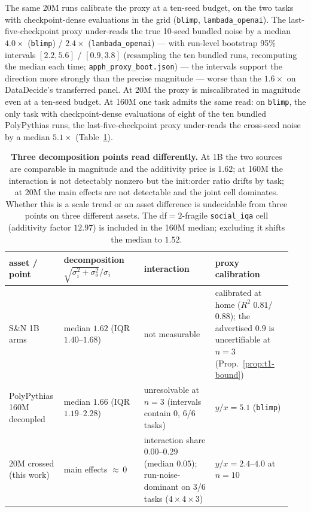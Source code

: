 The same 20M runs calibrate the proxy at a ten-seed budget, on the two tasks with
checkpoint-dense evaluations in the grid (\texttt{blimp}, \texttt{lambada\_openai}). The last-five-checkpoint proxy
under-reads the true 10-seed bundled noise by a median $4.0\times$ (\texttt{blimp}) /
$2.4\times$ (\texttt{lambada\_openai}) --- with run-level bootstrap 95\% intervals
$[2.2, 5.6]$ / $[0.9, 3.8]$ (resampling the ten bundled runs, recomputing the median each
time; \texttt{apph\_proxy\_boot.json}) --- the intervals support the direction more strongly than the precise magnitude ---
worse than the $1.6\times$ on DataDecide's
transferred panel. At 20M the proxy is miscalibrated in magnitude even at a ten-seed budget. At 160M one task admits the same read: on \texttt{blimp}, the only task with checkpoint-dense evaluations of eight of the ten bundled PolyPythias runs, the last-five-checkpoint proxy under-reads the cross-seed noise by a median $5.1\times$ (Table~\ref{tab:crossed}).

\begin{table}[!htbp]
\centering
\caption{\textbf{Three decomposition points read differently.} At 1B the two sources are
comparable in magnitude and the additivity price is $1.62$; at 160M the interaction is not
detectably nonzero but the init:order ratio drifts by task; at 20M the main effects are not
detectable and the joint cell dominates. Whether this is a scale trend or an asset difference
is undecidable from three points on three different assets. The df$=2$-fragile
\texttt{social\_iqa} cell (additivity factor $12.97$) is included in the 160M median;
excluding it shifts the median to $1.52$.}
\label{tab:crossed}
\footnotesize
\setlength{\tabcolsep}{3pt}
\begin{tabular}{@{}p{0.17\linewidth}p{0.27\linewidth}p{0.24\linewidth}p{0.26\linewidth}@{}}
\toprule
asset / point & decomposition $\sqrt{\sigma_i^2{+}\sigma_o^2}/\sigma_i$ & interaction & proxy
calibration \\
\midrule
S\&N 1B arms & median $1.62$ (IQR $1.40$--$1.68$) & not measurable & calibrated at home ($R^2$ $0.81$/$0.88$); the advertised
$0.9$ is uncertifiable at $n{=}3$ (Prop.~\ref{prop:t1-bound}) \\
PolyPythias 160M decoupled & median $1.66$ (IQR $1.19$--$2.28$) & unresolvable
at $n{=}3$ (intervals contain 0, 6/6 tasks) & $y/x = 5.1$ (\texttt{blimp}) \\
20M crossed (this work) & main effects ${\approx}\,0$ & interaction share $0.00$--$0.29$ (median $0.05$); run-noise-dominant on 3/6 tasks ($4{\times}4{\times}3$) & $y/x = 2.4$--$4.0$ at $n{=}10$ \\
\bottomrule
\end{tabular}
\end{table}

